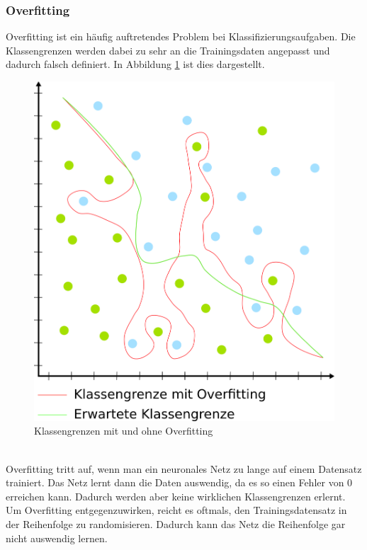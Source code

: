 \documentclass[11pt]{article}
\begin{document}
\subsubsection{Overfitting}
Overfitting ist ein häufig auftretendes Problem bei Klassifizierungsaufgaben. Die Klassengrenzen werden dabei zu sehr an die Trainingsdaten angepasst und dadurch falsch definiert. In Abbildung \ref{Overfitting} ist dies dargestellt.
\begin{figure}[h]
	\centering
	\includegraphics[width=0.6\linewidth]{../graphics/overfitting.png}
	\caption{Klassengrenzen mit und ohne Overfitting}
	\label{Overfitting}
\end{figure}
\\
Overfitting tritt auf, wenn man ein neuronales Netz zu lange auf einem Datensatz trainiert. Das Netz lernt dann die Daten auswendig, da es so einen Fehler von 0 erreichen kann. Dadurch werden aber keine wirklichen Klassengrenzen erlernt.\\
Um Overfitting entgegenzuwirken, reicht es oftmals, den Trainingsdatensatz in der Reihenfolge zu randomisieren. Dadurch kann das Netz die Reihenfolge gar nicht auswendig lernen.
\end{document}
